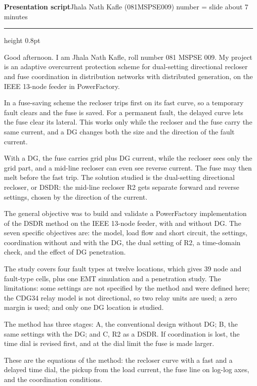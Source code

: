 \documentclass[11pt,a4paper]{article}
\newcommand{\slide}[2]{\par\vspace{4.5pt}\noindent
  \makebox[0.95cm][r]{\fontsize{13}{15}\selectfont\bfseries\color{navy}#1}\hspace{0.3cm}%
  \parbox[t]{\dimexpr\linewidth-1.25cm}{\fontsize{11.3}{14.3}\selectfont\raggedright #2}\par}
\begin{document}
{\large\bfseries\color{navy} Presentation script}\hfill{\small Jhala Nath Kafle (081MSPSE009) \quad
number = slide \quad about 7 minutes}\par\vspace{2pt}
{\color{navy}\hrule height 0.8pt}

\slide{1}{Good afternoon. I am Jhala Nath Kafle, roll number 081 MSPSE 009. My project is an adaptive overcurrent protection scheme for dual-setting directional recloser and fuse coordination in distribution networks with distributed generation, on the IEEE 13-node feeder in PowerFactory.}

\slide{2}{In a fuse-saving scheme the recloser trips first on its fast curve, so a temporary fault clears and the fuse is saved. For a permanent fault, the delayed curve lets the fuse clear its lateral. This works only while the recloser and the fuse carry the same current, and a DG changes both the size and the direction of the fault current.}

\slide{3}{With a DG, the fuse carries grid plus DG current, while the recloser sees only the grid part, and a mid-line recloser can even see reverse current. The fuse may then melt before the fast trip. The solution studied is the dual-setting directional recloser, or DSDR: the mid-line recloser R2 gets separate forward and reverse settings, chosen by the direction of the current.}

\slide{4}{The general objective was to build and validate a PowerFactory implementation of the DSDR method on the IEEE 13-node feeder, with and without DG. The seven specific objectives are: the model, load flow and short circuit, the settings, coordination without and with the DG, the dual setting of R2, a time-domain check, and the effect of DG penetration.}

\slide{5}{The study covers four fault types at twelve locations, which gives 39 node and fault-type cells, plus one EMT simulation and a penetration study. The limitations: some settings are not specified by the method and were defined here; the CDG34 relay model is not directional, so two relay units are used; a zero margin is used; and only one DG location is studied.}

\slide{6}{The method has three stages: A, the conventional design without DG; B, the same settings with the DG; and C, R2 as a DSDR. If coordination is lost, the time dial is revised first, and at the dial limit the fuse is made larger.}

\slide{7}{These are the equations of the method: the recloser curve with a fast and a delayed time dial, the pickup from the load current, the fuse line on log-log axes, and the coordination conditions.}
\end{document}
